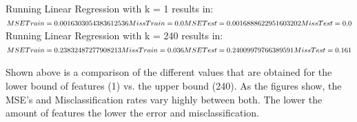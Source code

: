 \documentclass[a4paper]{article}
\begin{document}
\begin{multicols}{2}

Running Linear Regression with k = 1 results in: \\

$MSE Train = 0.0016303054383612536 \\ Miss Train = 0.0 \\ MSE Test = 0.0016888622951603202 \\ Miss Test = 0.0$ \\

Running Linear Regression with k = 240 results in: \\

$MSE Train = 0.23832487277908213 \\ Miss Train = 0.036 \\ MSE Test = 0.24009979766389591 \\ Miss Test = 0.161$
\\

\end{multicols}

Shown above is a comparison of the different values that are obtained for the lower bound of features (1) vs. the upper bound (240). As the figures show, the MSE's and Misclassification rates vary highly between both. The lower the amount of features the lower the error and misclassification. \\
\end{document}
